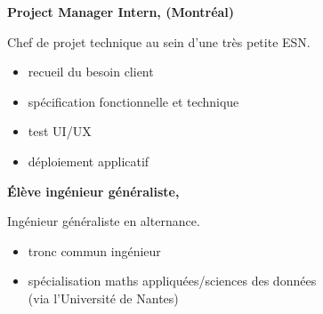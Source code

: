 \documentclass{cv}
\begin{document}
\begin{minipage}[t]{.65\textwidth}
\begin{expbox}[title={déc. 2016, \faicon{clock-o} 3 ans}]
\end{expbox}

\begin{expbox}[title={mai 2018, \faicon{clock-o} 4 mois}]

	\begin{minipage}[t]{\logoboxwidth}
	\centering
	\end{minipage}
	\begin{minipage}[t]{0.8\textwidth}
	\textbf{Project Manager Intern, \adfab{} (Montréal)}\smallskip

	Chef de projet technique au sein d'une très petite ESN.

	\begin{itemize}
	\item recueil du besoin client
	\item spécification fonctionnelle et technique
	\item test UI/UX
	\item déploiement applicatif
	\end{itemize}
	\end{minipage}

\end{expbox}

\begin{expbox}[title={2016 -- 2019}]

	\begin{minipage}[t]{\logoboxwidth}
	\centering
	\end{minipage}
	\begin{minipage}[t]{0.8\textwidth}
	\textbf{Élève ingénieur généraliste, \ecn{}}\smallskip

	Ingénieur généraliste en alternance.

	\begin{itemize}
	\item tronc commun ingénieur
	\item spécialisation maths appliquées/sciences des données\\ (via l'Université de Nantes)
	\end{itemize}
	\end{minipage}

\end{expbox}
\end{minipage}
\hfill
\end{document}
